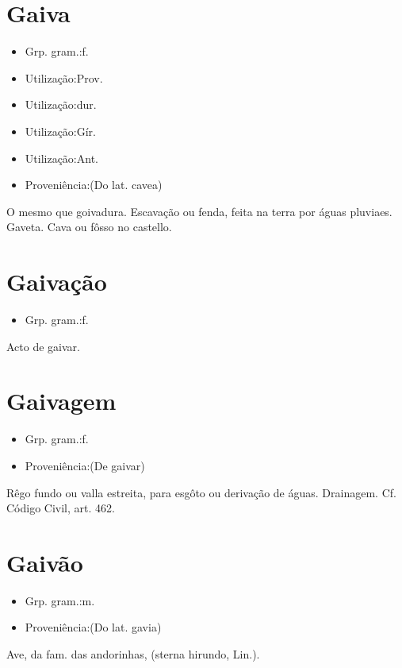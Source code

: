 \section{Gaiva}
\begin{itemize}
\item {Grp. gram.:f.}
\end{itemize}
\begin{itemize}
\item {Utilização:Prov.}
\end{itemize}
\begin{itemize}
\item {Utilização:dur.}
\end{itemize}
\begin{itemize}
\item {Utilização:Gír.}
\end{itemize}
\begin{itemize}
\item {Utilização:Ant.}
\end{itemize}
\begin{itemize}
\item {Proveniência:(Do lat. \textunderscore cavea\textunderscore )}
\end{itemize}
O mesmo que \textunderscore goivadura\textunderscore .
Escavação ou fenda, feita na terra por águas pluviaes.
Gaveta.
Cava ou fôsso no castello.
\section{Gaivação}
\begin{itemize}
\item {Grp. gram.:f.}
\end{itemize}
Acto de gaivar.
\section{Gaivagem}
\begin{itemize}
\item {Grp. gram.:f.}
\end{itemize}
\begin{itemize}
\item {Proveniência:(De \textunderscore gaivar\textunderscore )}
\end{itemize}
Rêgo fundo ou valla estreita, para esgôto ou derivação de águas.
Drainagem. Cf. \textunderscore Código Civil\textunderscore , art. 462.
\section{Gaivão}
\begin{itemize}
\item {Grp. gram.:m.}
\end{itemize}
\begin{itemize}
\item {Proveniência:(Do lat. \textunderscore gavia\textunderscore )}
\end{itemize}
Ave, da fam. das andorinhas, (\textunderscore sterna hirundo\textunderscore , Lin.).
